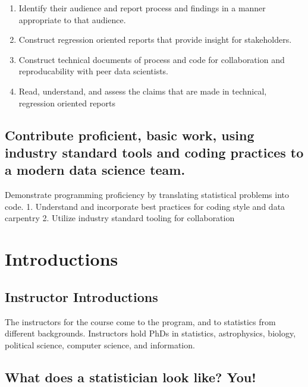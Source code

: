 \documentclass[
]{book}
\providecommand{\tightlist}{%
  \setlength{\itemsep}{0pt}\setlength{\parskip}{0pt}}
\theoremstyle{definition}
\theoremstyle{definition}
\theoremstyle{definition}
\theoremstyle{definition}
\theoremstyle{remark}
\begin{document}
\begin{enumerate}
\def\labelenumi{\arabic{enumi}.}
\tightlist
\item
  Identify their audience and report process and findings in a manner appropriate to that audience.
\item
  Construct regression oriented reports that provide insight for stakeholders.
\item
  Construct technical documents of process and code for collaboration and reproducability with peer data scientists.
\item
  Read, understand, and assess the claims that are made in technical, regression oriented reports
\end{enumerate}

\hypertarget{contribute-proficient-basic-work-using-industry-standard-tools-and-coding-practices-to-a-modern-data-science-team.}{%
\subsection{Contribute proficient, basic work, using industry standard tools and coding practices to a modern data science team.}\label{contribute-proficient-basic-work-using-industry-standard-tools-and-coding-practices-to-a-modern-data-science-team.}}

Demonstrate programming proficiency by translating statistical problems into code.
1. Understand and incorporate best practices for coding style and data carpentry
2. Utilize industry standard tooling for collaboration

\hypertarget{introductions}{%
\section{Introductions}\label{introductions}}

\hypertarget{instructor-introductions}{%
\subsection{Instructor Introductions}\label{instructor-introductions}}

The instructors for the course come to the program, and to statistics from different backgrounds. Instructors hold PhDs in statistics, astrophysics, biology, political science, computer science, and information.

\hypertarget{what-does-a-statistician-look-like-you}{%
\subsection{What does a statistician look like? You!}\label{what-does-a-statistician-look-like-you}}
\end{document}
